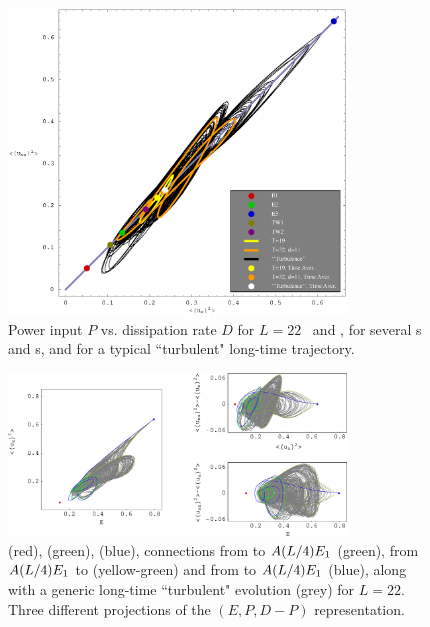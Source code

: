 

\begin{figure}[t] 
\begin{center}
    \includegraphics[width=0.8\textwidth]{figs/energyBalancePlot.eps}
\end{center}
\caption{
Power input $P$ vs.
dissipation rate $D$ for $L=22$ \eqva\
and \reqva, for several
\po s and \rpo s, and for a typical ``turbulent" long-time trajectory.
        }
\label{f:drivedrag}
\end{figure}

\begin{figure}[t] 
\begin{center}
    \includegraphics[width=0.8\textwidth]{figs/ks22TurbConn_xfig.eps}
\end{center}
\caption{
 (red),  (green),  (blue), 
connections from  to $A(L/4)E_{1}$ (green),
from $A(L/4)E_{1}$ to \EQV{1} (yellow-green) 
and from  to $A(L/4)E_{1}$ (blue), along
with a generic long-time ``turbulent" evolution (grey) for $L=22$. 
Three different projections of the 
$(E,P,D-P)$
representation.
        }
\label{f:drivedragConn}
\end{figure}

